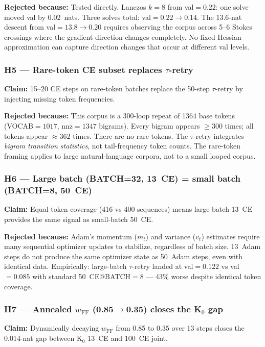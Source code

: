 \documentclass[11pt]{amsart}
\begin{document}
\textbf{Rejected because:} Tested directly.
Lanczos $k=8$ from val$=0.22$: one solve moved val by 0.02~nats.
Three solves total: val$=0.22 \to 0.14$.
The 13.6-nat descent from val$=13.8 \to 0.20$ requires observing
the corpus across 5--6 Stokes crossings where the gradient direction
changes completely. No fixed Hessian approximation can capture
direction changes that occur at different val levels.

\subsubsection*{H5 — Rare-token CE subset replaces $\tau$-retry}

\textbf{Claim:} 15--20 CE steps on rare-token batches replace the 50-step
$\tau$-retry by injecting missing token frequencies.

\textbf{Rejected because:} This corpus is a 300-loop repeat of 1364 base
tokens (VOCAB$=1017$, $\text{nnz}=1347$ bigrams).
Every bigram appears $\geq 300$ times; all tokens appear $\approx 362$ times.
There are no rare tokens.
The $\tau$-retry integrates \emph{bigram transition statistics},
not tail-frequency token counts.
The rare-token framing applies to large natural-language corpora,
not to a small looped corpus.

\subsubsection*{H6 — Large batch (BATCH=32, 13~CE) = small batch (BATCH=8, 50~CE)}

\textbf{Claim:} Equal token coverage (416 vs 400 sequences) means
large-batch 13~CE provides the same signal as small-batch 50~CE.

\textbf{Rejected because:} Adam's momentum ($m_t$) and variance ($v_t$)
estimates require many sequential optimizer updates to stabilize,
regardless of batch size.
13~Adam steps do not produce the same optimizer state as 50~Adam steps,
even with identical data.
Empirically: large-batch $\tau$-retry landed at val$=0.122$ vs val$=0.085$
with standard 50~CE@BATCH$=8$ — 43\% worse despite identical token coverage.

\subsubsection*{H7 — Annealed $w_\mathrm{FF}$ (0.85$\to$0.35) closes the K$_0$ gap}

\textbf{Claim:} Dynamically decaying $w_\mathrm{FF}$ from 0.85 to 0.35
over 13 steps closes the 0.014-nat gap between K$_0$ 13~CE and 100~CE joint.
\end{document}
